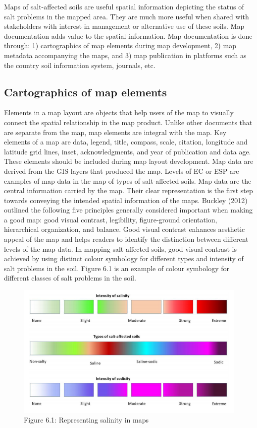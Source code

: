 \documentclass[
  10pt,
  b5paper,
]{book}
\begin{document}
Maps of salt-affected soils are useful spatial information depicting the status of salt problems in the mapped area. They are much more useful when shared with stakeholders with interest in management or alternative use of these soils. Map documentation adds value to the spatial information. Map documentation is done through: 1) cartographics of map elements during map development, 2) map metadata accompanying the maps, and 3) map publication in platforms such as the country soil information system, journals, etc.

\hypertarget{cartographics-of-map-elements}{%
\subsection{Cartographics of map elements}\label{cartographics-of-map-elements}}

Elements in a map layout are objects that help users of the map to visually connect the spatial relationship in the map product. Unlike other documents that are separate from the map, map elements are integral with the map. Key elements of a map are data, legend, title, compass, scale, citation, longitude and latitude grid lines, inset, acknowledgments, and year of publication and data age. These elements should be included during map layout development.
Map data are derived from the GIS layers that produced the map. Levels of EC or ESP are examples of map data in the map of types of salt-affected soils. Map data are the central information carried by the map. Their clear representation is the first step towards conveying the intended spatial information of the maps. Buckley (2012) outlined the following five principles generally considered important when making a good map: good visual contrast, legibility, figure-ground orientation, hierarchical organization, and balance.
Good visual contrast enhances aesthetic appeal of the map and helps readers to identify the distinction between different levels of the map data. In mapping salt-affected soils, good visual contrast is achieved by using distinct colour symbology for different types and intensity of salt problems in the soil. Figure 6.1 is an example of colour symbology for different classes of salt problems in the soil.

\begin{figure}
\centering
\includegraphics{figures/images/Figure6.1.png}
\caption{Figure 6.1: Representing salinity in maps}
\end{figure}
\end{document}
